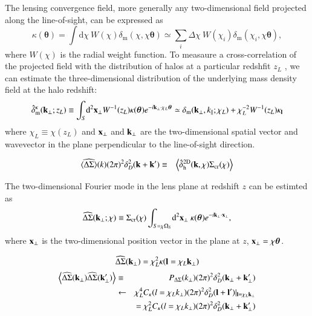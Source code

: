 \documentclass[onecolumn,notitlepage,showpacs,amsmath,amssymb,prd,floatfix]{revtex4-1}
\def\ave#1{\left\langle #1 \right\rangle}
\newcommand{\bx}{{\bf x}}
\newcommand{\bk}{{\bf k}}
\newcommand{\btheta}{{\bm{\theta}}}
\newcommand{\bl}{{\bf l}}
\newcommand{\dr}{\mathrm{d}}
\newcommand{\deltam}{\delta_{\mathrm{m}}}
\newcommand{\bh}{\mathrm{h}}
\newcommand{\sigmacr}{\Sigma_{\rm cr}}
\newcommand{\dsigma}{\Delta\Sigma}
\newcommand{\hdsigma}{\widehat{\dsigma}}
\newcommand{\havedsigma}{\widehat{\ave{\dsigma}}}
\begin{document}
The lensing convergence field, more generally any two-dimensional field
projected along the line-of-sight, can be expressed as
%
\begin{equation}
\kappa(\btheta)=\int\!\dr\chi~W(\chi)\deltam(\chi,\chi\btheta)\simeq
 \sum_{i}\Delta\chi~ W(\chi_i)\deltam(\chi_i,\chi\btheta),
\end{equation}
%
where $W(\chi)$ is the radial weight function. To measaure a
cross-correlation of the projected field with the distribution of halos
at a particular redshfit $z_L$ \citep{Hikageetal:13,Nishizawaetal:13},
we can estimate the three-dimensional distribution of the underlying
mass density field at the halo redshift:
%
\begin{equation}
 \hat{\delta}_{\mathrm{m}}^\kappa(\bk_\perp;z_L)\equiv
  \int_S\! \dr^2\bx_\perp W^{-1}(z_L)\kappa(\btheta)e^{-i\bk_\perp\cdot
  \chi_L\btheta}
  \simeq \deltam(\bk_\perp,k_\parallel;\chi_L)+\chi_L^{-2}W^{-1}(z_L)\kappa_{\bl}
\end{equation}
%
where $\chi_L\equiv \chi(z_L)$ and $\bx_\perp$ and $\bk_\perp$ are the
two-dimensional spatial vector and wavevector in the plane perpendicular
to the line-of-sight direction.




\begin{eqnarray}
 \havedsigma(k)(2\pi)^2\delta_D^2(\bk+\bk')&\equiv &
  \ave{\hat{\delta}_\bh^{\rm 2D}(\bk,\chi)\sigmacr(\chi)}
\end{eqnarray}

The two-dimensional Fourier mode in the lens plane at redshift $z$ can
be estimted as
%
\begin{equation}
\hdsigma(\bk_\perp;\chi)\equiv\sigmacr(\chi)\int_{S=\chi\Omega_S}\!\dr^2\bx_\perp~\kappa(\btheta)e^{-i\bk_\perp\cdot\bx_\perp},
\end{equation}
%
where $\bx_\perp$ is the two-dimensional position vector in the 
plane at $z$, $\bx_\perp=\chi\btheta$.

\begin{equation}
 \hdsigma(\bk_\perp)=\chi_L^2 \kappa({\bl=\chi_L\bk_\perp})
\end{equation}
%
\begin{eqnarray}
 \ave{\hdsigma(\bk_\perp)\hdsigma(\bk'_\perp)}&\equiv&
  P_{\dsigma}(k_\perp)(2\pi)^2\delta_D^2(\bk_\perp+\bk'_\perp)\nonumber\\
&\leftarrow &\chi_L^4
 C_\kappa(l=\chi_Lk_\perp)(2\pi)^2\delta_D^2(\bl+\bl')|_{\bl=\chi_L\bk_\perp}\nonumber\\ 
&&=\chi_L^2 C_\kappa(l=\chi_Lk_\perp)(2\pi)^2\delta_D^2(\bk_\perp+\bk'_\perp)
\end{eqnarray}
\end{document}
